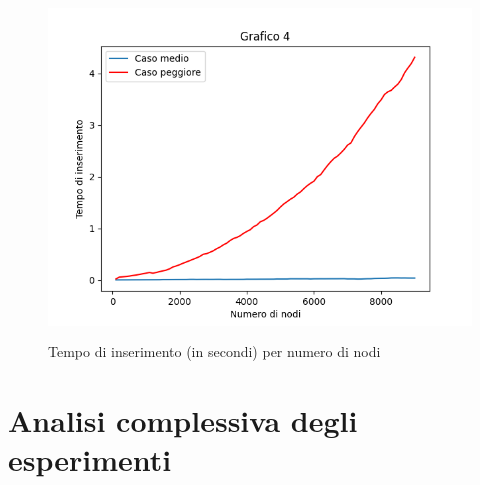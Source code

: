 \documentclass{article}
\begin{document}
\begin{figure}[H]
\centering
\includegraphics[height=9cm]{Figure_4.png}
\caption{Tempo di inserimento (in secondi) per numero di nodi}
\label{fig:mesh4}
\end{figure}


\section{Analisi complessiva degli esperimenti}
\end{document}
